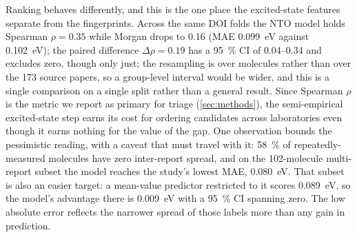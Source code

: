 Ranking behaves differently, and this is the one place the excited-state features
separate from the fingerprints. Across the same DOI folds the NTO model holds
Spearman $\rho = \num{0.35}$ while Morgan drops to \num{0.16}
(MAE \qty{0.099}{\electronvolt} against \qty{0.102}{\electronvolt}); the paired
difference $\Delta\rho = \num{0.19}$ has a \qty{95}{\percent} CI of
\numrange{0.04}{0.34} and excludes zero, though only just; the resampling is over
molecules rather than over the \num{173} source papers, so a group-level interval would
be wider, and this is a single comparison on a single split rather than a general
result. Since Spearman $\rho$ is the metric we
report as primary for triage (\cref{sec:methods}), the semi-empirical excited-state
step earns its cost for ordering candidates across laboratories even though it earns
nothing for the value of the gap. One observation bounds the pessimistic reading, with a caveat that must travel with it:
\qty{58}{\percent} of repeatedly-measured molecules have zero inter-report spread, and
on the \num{102}-molecule multi-report subset the model reaches the study's lowest MAE,
\qty{0.080}{\electronvolt}. That subset is also an easier target: a mean-value predictor
restricted to it scores \qty{0.089}{\electronvolt}, so the model's advantage there is
\qty{0.009}{\electronvolt} with a \qty{95}{\percent} CI spanning zero. The low absolute
error reflects the narrower spread of those labels more than any gain in prediction.

